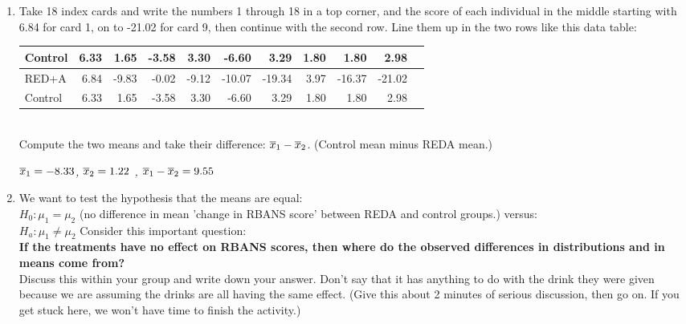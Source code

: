 \begin{enumerate}
   Shape
\begin{students}
    \vspace{1cm}    
\end{students}

\begin{key}
  {\it            RED+A seems most symmetric (boxplot), Cotrol
         has some outliers.
}
\end{key}


The researchers used a computer randomization to assign the 
subjects into the groups. We'll shuffle cards instead. 

\item  Take 18 index cards and write the numbers 1 through 18 in a top
  corner, and the score of each individual in the middle starting with
  6.84 for card 1, on to -21.02 for card 9, then continue with the
  second row. Line them up in the two rows  like this data table: 

  \begin{tabular}{l|rrrrrrrrrr} \hline
Control&6.33&1.65&-3.58&3.30&-6.60&3.29&1.80&1.80&2.98&\\ \hline
RED+A & 6.84&-9.83&-0.02&-9.12&-10.07&-19.34&3.97&-16.37&-21.02&\\ \hline
Control&6.33&1.65&-3.58&3.30&-6.60&3.29&1.80&1.80&2.98&\\ \hline
\end{tabular}\\
Compute the two means and take their difference: $\overline{x}_1 -
\overline{x}_2$. (Control mean minus REDA mean.)
\begin{students}
    \vspace{1cm}    
\end{students}

\begin{key}
  {\it   $\overline{x}_1 = -8.33$, $\overline{x}_2 = 1.22$ ,  $\overline{x}_1 -\overline{x}_2 = 9.55$ }
\end{key}


\item We want to test the hypothesis that the means are equal:\\
  $H_0: \mu_1 = \mu_2$  (no difference in mean 'change in RBANS score'
  between REDA and control groups.)  versus:\\
  $H_a:  \mu_1 \neq \mu_2$ \hfill Consider this important question:
  \\
{\bf \sf
If the treatments have no effect on RBANS scores, then where do the
observed differences in distributions and in means come from?
}\vspace*{.2cm} \\
   Discuss this within your group and write down your answer.
  Don't say that it has anything to do with the drink they were given
  because we are assuming the drinks are all having the same effect. 
  (Give this about 2 minutes of serious discussion, then go on.
   If you get stuck here, we  won't have time to finish the activity.)
\begin{students}
    \vspace{7cm}    
\end{students}


\end{enumerate}
